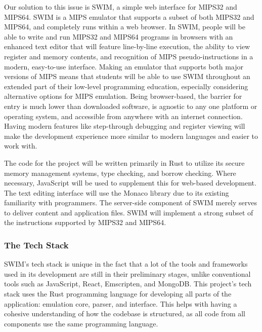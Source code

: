 \documentclass[
    paper=letter,
    parskip=half,
    fontsize=12pt,
    titlepage=firstiscover,
    toc=bibliography,
    numbers=endperiod
]{scrartcl}
\begin{document}
Our solution to this issue is SWIM, a simple web interface for MIPS32 and MIPS64. SWIM is a MIPS emulator that supports a subset of both MIPS32 and MIPS64, and completely runs within a web browser. In SWIM, people will be able to write and run MIPS32 and MIPS64 programs in browsers with an enhanced text editor that will feature line-by-line execution, the ability to view register and memory contents, and recognition of MIPS pseudo-instructions in a modern, easy-to-use interface. Making an emulator that supports both major versions of MIPS means that students will be able to use SWIM throughout an extended part of their low-level programming education, especially considering alternative options for MIPS emulation. Being browser-based, the barrier for entry is much lower than downloaded software, is agnostic to any one platform or operating system, and accessible from anywhere with an internet connection. Having modern features like step-through debugging and register viewing will make the development experience more similar to modern languages and easier to work with.

The code for the project will be written primarily in Rust \cite{rust-book} to utilize its secure memory management systems, type checking, and borrow checking. Where necessary, JavaScript will be used to supplement this for web-based development. The text editing interface will use the Monaco library \cite{monaco} due to its existing familiarity with programmers. The server-side component of SWIM merely serves to deliver content and application files. SWIM will implement a strong subset of the instructions supported by MIPS32 and MIPS64.

\subsubsection{The Tech Stack}
SWIM's tech stack is unique in the fact that a lot of the tools and frameworks used in its development are still in their preliminary stages, unlike conventional tools such as JavaScript, React, Emscripten, and MongoDB. This project's tech stack uses the Rust programming language for developing all parts of the application: emulation core, parser, and interface. This helps with having a cohesive understanding of how the codebase is structured, as all code from all components use the same programming language.
\end{document}
